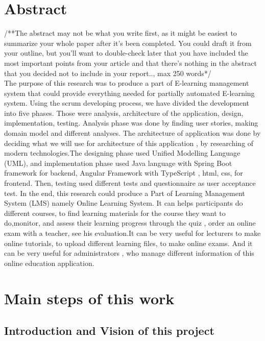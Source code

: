 \documentclass{scrartcl}
\begin{document}
\section{Abstract}
/**The abstract may not be what you write first, as it might be easiest to summarize your whole paper after it's been completed. You could draft it from your outline, but you'll want to double-check later that you have included the most important points from your article and that there's nothing in the abstract that you decided not to include in your report.., max 250 words*/\\
The purpose of this research was to produce a  part of E-learning management system that could provide  everything needed for partially automated  E-learning system. Using the scrum developing process, we have divided the development into five phases. Those were analysis, architecture of the application, design, implementation, testing. Analysis phase was done by finding user stories, making domain model and different analyses. The architecture of application was done by deciding what we will use for architecture of this application , by researching of modern technologies.The designing phase used Unified Modelling Language (UML), and implementation phase used Java language with Spring Boot framework for backend, Angular Framework with TypeScript , html, css, for frontend. Then, testing used different tests and questionnaire as user acceptance test. In the end, this research could produce a Part of Learning Management System (LMS) namely Online Learning System. It can  helps participants do different courses, to find learning materials for the  course they want to do,monitor, and assess their learning progress through the quiz , order an online exam with a teacher, see his evaluation.It can be very useful for lecturers to make online tutorials, to upload different learning files, to make online exams. And it can be very useful for administrators , who manage different information of this online education application.

 



\section{Main steps of this work}


\subsection{Introduction and Vision of this project}
\end{document}
